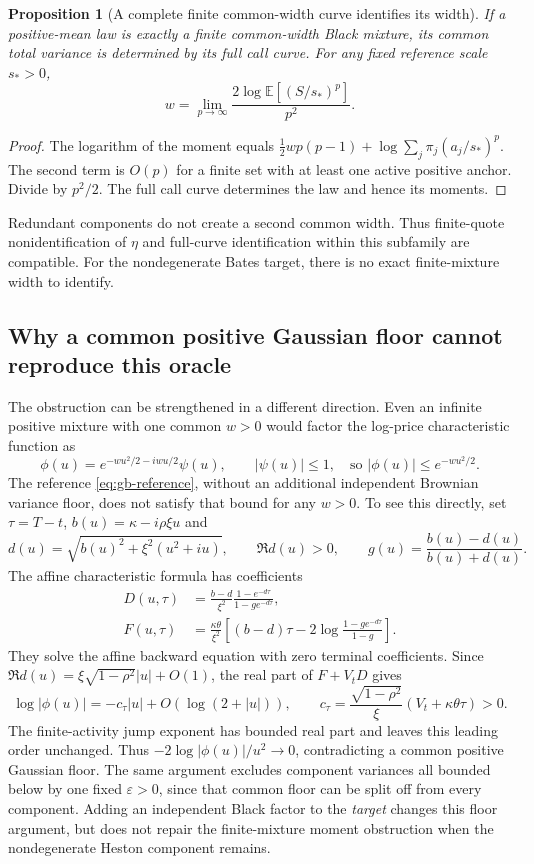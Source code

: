 \documentclass[11pt,a4paper]{article}
\numberwithin{equation}{section}
\newtheorem{proposition}[theorem]{Proposition}
\theoremstyle{definition}\newtheorem{definition}[theorem]{Definition}
\theoremstyle{remark}\newtheorem{remark}[theorem]{Remark}
\newcommand{\E}{\mathbb E}\newcommand{\R}{\mathbb R}
\begin{document}
\begin{proposition}[A complete finite common-width curve identifies its width]
If a positive-mean law is exactly a finite common-width Black mixture, its common total variance is determined by its full call curve. For any fixed reference scale $s_*>0$,
\begin{equation}
 w=\lim_{p\to\infty}\frac{2\log\E[(S/s_*)^p]}{p^2}.
 \label{eq:gb-width-identification}
\end{equation}
\end{proposition}
\begin{proof}
The logarithm of the moment equals $\tfrac12wp(p-1)+\log\sum_j\pi_j(a_j/s_*)^p$. The second term is $O(p)$ for a finite set with at least one active positive anchor. Divide by $p^2/2$. The full call curve determines the law and hence its moments.
\end{proof}
Redundant components do not create a second common width. Thus finite-quote nonidentification of $\eta$ and full-curve identification within this subfamily are compatible. For the nondegenerate Bates target, there is no exact finite-mixture width to identify.

\subsection{Why a common positive Gaussian floor cannot reproduce this oracle}
The obstruction can be strengthened in a different direction. Even an infinite positive mixture with one common $w>0$ would factor the log-price characteristic function as
\[
 \phi(u)=e^{-wu^2/2-iwu/2}\psi(u),\qquad |\psi(u)|\leq1,
 \quad\text{so } |\phi(u)|\leq e^{-wu^2/2}.
\]
The reference \eqref{eq:gb-reference}, without an additional independent Brownian variance floor, does not satisfy that bound for any $w>0$. To see this directly, set $\tau=T-t$, $b(u)=\kappa-i\rho\xi u$ and
\[
 d(u)=\sqrt{b(u)^2+\xi^2(u^2+iu)},\qquad \Re d(u)>0,
 \qquad g(u)=\frac{b(u)-d(u)}{b(u)+d(u)}.
\]
The affine characteristic formula has coefficients
\begin{align*}
 D(u,\tau)&=\frac{b-d}{\xi^2}\frac{1-e^{-d\tau}}{1-ge^{-d\tau}},\\
 F(u,\tau)&=\frac{\kappa\theta}{\xi^2}
 \left[(b-d)\tau-2\log\frac{1-ge^{-d\tau}}{1-g}\right].
\end{align*}
They solve the affine backward equation with zero terminal coefficients. Since $\Re d(u)=\xi\sqrt{1-\rho^2}|u|+O(1)$, the real part of $F+V_tD$ gives
\begin{equation}
 \log|\phi(u)|=-c_\tau|u|+O(\log(2+|u|)),\qquad
 c_\tau=\frac{\sqrt{1-\rho^2}}{\xi}(V_t+\kappa\theta\tau)>0.
 \label{eq:gb-char-tail}
\end{equation}
The finite-activity jump exponent has bounded real part and leaves this leading order unchanged. Thus $-2\log|\phi(u)|/u^2\to0$, contradicting a common positive Gaussian floor. The same argument excludes component variances all bounded below by one fixed $\varepsilon>0$, since that common floor can be split off from every component. Adding an independent Black factor to the \emph{target} changes this floor argument, but does not repair the finite-mixture moment obstruction when the nondegenerate Heston component remains.
\end{document}
